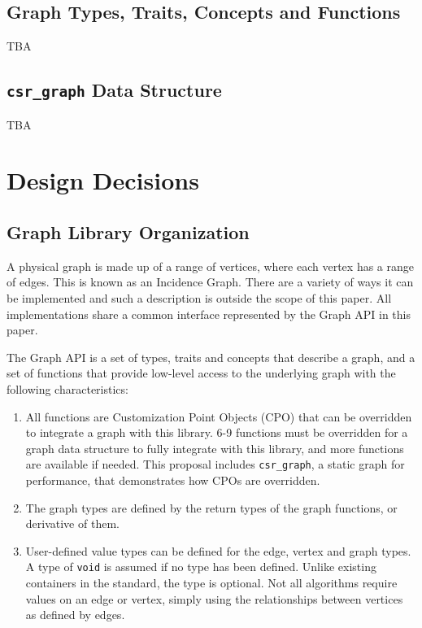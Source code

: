 \documentclass[10pt,onecolumn]{article}
\newcommand{\tcode}[1]{\lstinline{#1}}
\begin{document}
\subsection{Graph Types, Traits, Concepts and Functions}
TBA

\subsection{\tcode{csr_graph} Data Structure}
TBA

\section{Design Decisions}
\subsection{Graph Library Organization}
A physical graph is made up of a range of vertices, where each vertex has a range of edges. This is known as an Incidence Graph. There are a variety of 
ways it can be implemented and such a description is outside the scope of this paper. All implementations share a common interface represented by the
Graph API in this paper.

The Graph API is a set of types, traits and concepts that describe a graph, and a set of functions that provide low-level access to the 
underlying graph with the following characteristics:
\begin{enumerate}
\item All functions are Customization Point Objects (CPO) that can be overridden to integrate a graph with this library. 
6-9 functions must be overridden for a graph data structure to fully integrate with this library, and more functions are available if needed. This proposal includes 
\tcode{csr_graph}, a static graph for performance, that demonstrates how CPOs are overridden.
\item The graph types are defined by the return types of the graph functions, or derivative of them.
\item User-defined value types can be defined for the edge, vertex and graph types. A type of \tcode{void} is assumed if no type has been defined.
Unlike existing containers in the standard, the type is optional. Not all algorithms require values on an edge or vertex, simply using the relationships
between vertices as defined by edges.
\end{enumerate}
\end{document}
